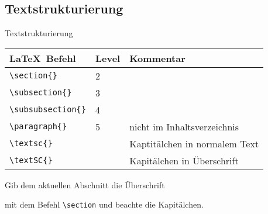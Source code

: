 \subsection{Textstrukturierung}
\begin{frame}[c]
	\begin{center}
		\large Textstrukturierung
	\end{center}
\end{frame}
\begin{frame}[fragile]
	\begin{center}
		\begin{tabular}{lll}
			\toprule
			\LaTeX\ Befehl					&	Level	&	Kommentar	\\ \midrule
			\lstinline|\section{}|			&	2		&	\\
			\lstinline|\subsection{}|		&	3		&	\\
			\lstinline|\subsubsection{}|	&	4		&	\\
			\lstinline|\paragraph{}|		&	5		&	nicht im Inhaltsverzeichnis \\ \midrule
			\lstinline|\textsc{}|			&			&	Kaptitälchen in normalem Text\\
			\lstinline|\textSC{}|			&			&	Kapitälchen in Überschrift\\
			\bottomrule
		\end{tabular}
	\end{center}

	\pause\btVFill
	\Aufgabee
	Gib dem aktuellen Abschnitt die Überschrift
		
		\textrm{}
		
	mit dem Befehl \lstinline[basicstyle=\normalfont\ttfamily\normalsize]|\section| und beachte die Kapitälchen.
	\vspace{1.3cm}
\end{frame}
